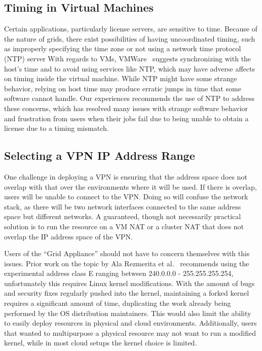 \documentclass[twocolumn]{svjour3}
\begin{document}
\subsection{Timing in Virtual Machines}

Certain applications, particularly license servers, are sensitive to time.
Because of the nature of grids, there exist possibilities of having
uncoordinated timing, such as improperly specifying the time zone or not using
a network time protocol (NTP) server With regards to VMs,
VMWare~\cite{vmware_timing} suggests synchronizing with the host's time and to
avoid using services like NTP, which may have adverse affects on timing inside
the virtual machine.  While NTP might have some strange behavior, relying on
host time may produce erratic jumps in time that some software cannot handle.
Our experiences recommends the use of NTP to address these concerns, which has
resolved many issues with strange software behavior and frustration from users
when their jobs fail due to being unable to obtain a license due to a timing
mismatch.

\subsection{Selecting a VPN IP Address Range}

One challenge in deploying a VPN is ensuring that the address space does not
overlap with that over the environments where it will be used.  If there is
overlap, users will be unable to connect to the VPN.  Doing so will confuse the
network stack, as there will be two network interfaces connected to the same
address space but different networks.  A guaranteed, though not necessarily
practical solution is to run the resource on a VM NAT or a cluster NAT that
does not overlap the IP address space of the VPN.

Users of the ``Grid Appliance'' should not have to concern themselves with this
issues.  Prior work on the topic by Ala Rezmerita et al.~\cite{pvc} recommends
using the experimental address class E ranging between 240.0.0.0 -
255.255.255.254, unfortunately this requires Linux kernel modifications.  With
the amount of bugs and security fixes regularly pushed into the kernel,
maintaining a forked kernel requires a significant amount of time, duplicating
the work already being performed by the OS distribution maintainers.  This
would also limit the ability to easily deploy resources in physical and cloud
environments.  Additionally, users that wanted to multipurpose a physical
resource may not want to run a modified kernel, while in most cloud setups the
kernel choice is limited.
\end{document}
